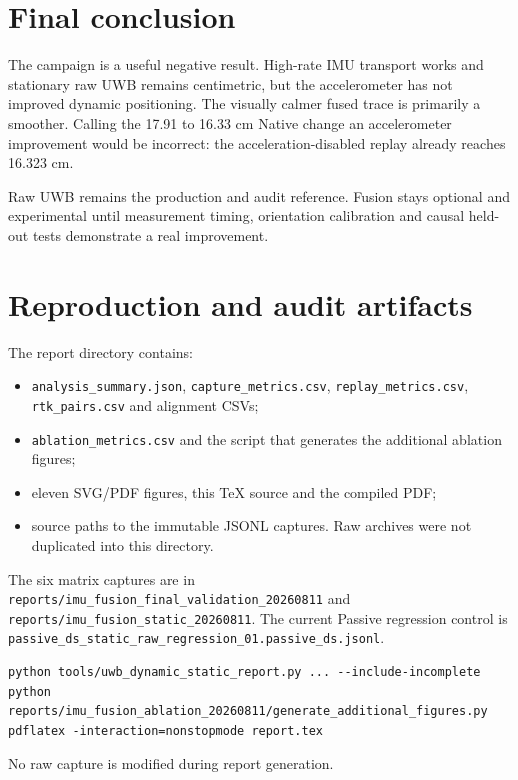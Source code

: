 \documentclass[10pt,a4paper]{article}
\begin{document}
\section{Final conclusion}

The campaign is a useful negative result. High-rate IMU transport works and
stationary raw UWB remains centimetric, but the accelerometer has not improved
dynamic positioning. The visually calmer fused trace is primarily a smoother.
Calling the 17.91 to 16.33 cm Native change an accelerometer improvement would
be incorrect: the acceleration-disabled replay already reaches 16.323 cm.

Raw UWB remains the production and audit reference. Fusion stays optional and
experimental until measurement timing, orientation calibration and causal
held-out tests demonstrate a real improvement.

\section{Reproduction and audit artifacts}

The report directory contains:
\begin{itemize}
\item \texttt{analysis\_summary.json}, \texttt{capture\_metrics.csv},
      \texttt{replay\_metrics.csv}, \texttt{rtk\_pairs.csv} and alignment CSVs;
\item \texttt{ablation\_metrics.csv} and the script that generates the
      additional ablation figures;
\item eleven SVG/PDF figures, this TeX source and the compiled PDF;
\item source paths to the immutable JSONL captures. Raw archives were not
      duplicated into this directory.
\end{itemize}

The six matrix captures are in
\texttt{reports/imu\_fusion\_final\_validation\_20260811} and
\texttt{reports/imu\_fusion\_static\_20260811}. The current Passive regression
control is
\texttt{passive\_ds\_static\_raw\_regression\_01.passive\_ds.jsonl}.

\begin{verbatim}
python tools/uwb_dynamic_static_report.py ... --include-incomplete
python reports/imu_fusion_ablation_20260811/generate_additional_figures.py
pdflatex -interaction=nonstopmode report.tex
\end{verbatim}

No raw capture is modified during report generation.
\end{document}
